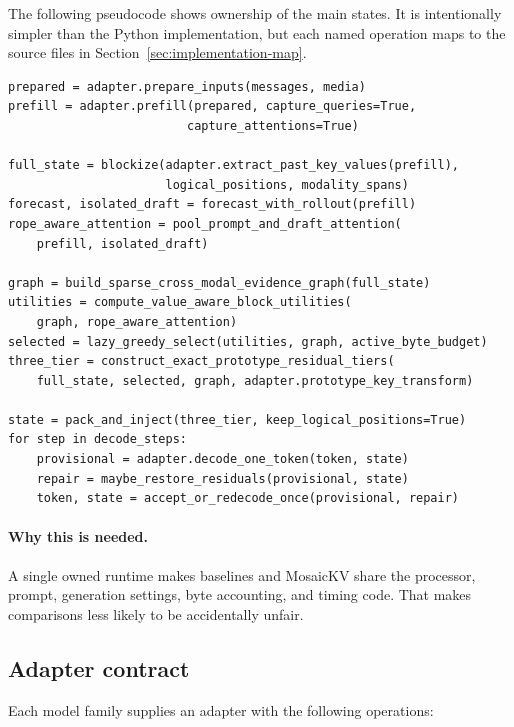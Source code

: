 \documentclass[11pt]{article}
\newcommand{\why}{\paragraph{Why this is needed.}}
\begin{document}
The following pseudocode shows ownership of the main states. It is intentionally simpler than the
Python implementation, but each named operation maps to the source files in
Section~\ref{sec:implementation-map}.

\begin{lstlisting}[style=mosaickv,language={}]
prepared = adapter.prepare_inputs(messages, media)
prefill = adapter.prefill(prepared, capture_queries=True,
                         capture_attentions=True)

full_state = blockize(adapter.extract_past_key_values(prefill),
                      logical_positions, modality_spans)
forecast, isolated_draft = forecast_with_rollout(prefill)
rope_aware_attention = pool_prompt_and_draft_attention(
    prefill, isolated_draft)

graph = build_sparse_cross_modal_evidence_graph(full_state)
utilities = compute_value_aware_block_utilities(
    graph, rope_aware_attention)
selected = lazy_greedy_select(utilities, graph, active_byte_budget)
three_tier = construct_exact_prototype_residual_tiers(
    full_state, selected, graph, adapter.prototype_key_transform)

state = pack_and_inject(three_tier, keep_logical_positions=True)
for step in decode_steps:
    provisional = adapter.decode_one_token(token, state)
    repair = maybe_restore_residuals(provisional, state)
    token, state = accept_or_redecode_once(provisional, repair)
\end{lstlisting}

\why A single owned runtime makes baselines and MosaicKV share the processor, prompt, generation
settings, byte accounting, and timing code. That makes comparisons less likely to be accidentally
unfair.

\subsection{Adapter contract}

Each model family supplies an adapter with the following operations:
\end{document}
